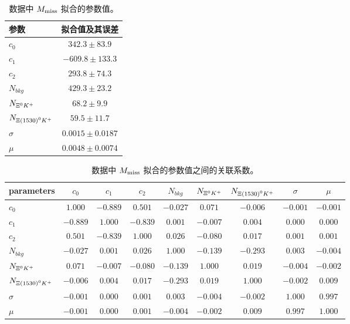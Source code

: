 \begin{table}[hp]
  \begin{center}
   \caption{数据中 $M_{\rm miss}$ 拟合的参数值。}
  \begin{tabular}{l|c}
      \hline 
参数  & 拟合值及其误差 \\ \hline
$c_{0}$  & $342.3\pm83.9$  \\
$c_{1}$  & $-609.8\pm133.3$  \\
$c_{2}$  & $293.8\pm74.3$  \\
$N_{bkg}$  & $429.3\pm23.2$  \\
$N_{\Xi^{0}K^{+}}$  & $68.2\pm9.9$  \\
$N_{\Xi{(1530)}^{0}K^{+}}$  & $59.5\pm11.7$  \\
$\sigma$  & $0.0015\pm0.0187$  \\
$\mu$  &  $0.0048\pm0.0074$  \\
\hline
   \end{tabular}
   \label{tab:par}
  \end{center}
  \end{table}

\begin{table}[hp]
  \begin{center}
   \caption{数据中 $M_{\rm miss}$ 拟合的参数值之间的关联系数。}
  \begin{tabular}{l|cccccccc}
      \hline 
parameters  &  $c_{0}$   &  $c_{1}$   & $c_{2}$   & $N_{bkg}$  &   $N_{\Xi^{0}K^{+}}$  &  $N_{\Xi{(1530)}^{0}K^{+}}$  &   $\sigma$ &  $\mu$ \\ \hline
$c_{0}$         &   $ 1.000$  &  $-0.889$  &  $ 0.501$  &  $-0.027$  &  $ 0.071$  &  $-0.006$  &  $-0.001$  &  $-0.001$ \\ 
$c_{1}$         &   $-0.889$  &  $ 1.000$  &  $-0.839$  &  $ 0.001$  &  $-0.007$  &  $ 0.004$  &  $ 0.000$  &  $ 0.000$ \\ 
$c_{2}$         &   $ 0.501$  &  $-0.839$  &  $ 1.000$  &  $ 0.026$  &  $-0.080$  &  $ 0.017$  &  $ 0.001$  &  $ 0.001$ \\ 
$N_{bkg}$       &   $-0.027$  &  $ 0.001$  &  $ 0.026$  &  $ 1.000$  &  $-0.139$  &  $-0.293$  &  $ 0.003$  &  $-0.004$ \\ 
$N_{\Xi^{0}K^{+}}$      &   $ 0.071$  &  $-0.007$  &  $-0.080$  &  $-0.139$  &  $ 1.000$  &  $ 0.019$  &  $-0.004$  &  $-0.002$ \\ 
$N_{\Xi{(1530)}^{0}K^{+}}$     &   $-0.006$  &  $ 0.004$  &  $ 0.017$  &  $-0.293$  &  $ 0.019$  &  $ 1.000$  &  $-0.002$  &  $ 0.009$ \\ 
$\sigma$        &   $-0.001$  &  $ 0.000$  &  $ 0.001$  &  $ 0.003$  &  $-0.004$  &  $-0.002$  &  $ 1.000$  &  $ 0.997$ \\ 
$\mu$           &   $-0.001$  &  $ 0.000$  &  $ 0.001$  &  $-0.004$  &  $-0.002$  &  $ 0.009$  &  $ 0.997$  &  $ 1.000$ \\    
\hline
   \end{tabular}
   \label{tab:rho}
  \end{center}
  \end{table}





